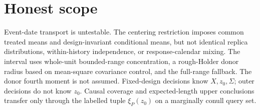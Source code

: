 \documentclass{article}
\begin{document}
\section{Honest scope}

Event-date transport is untestable. The centering restriction imposes common treated means and design-invariant conditional means, but not identical replica distributions, within-history independence, or response-calendar mixing. The interval uses whole-unit bounded-range concentration, a rough-Holder donor radius based on mean-square covariance control, and the full-range fallback. The donor fourth moment is not assumed. Fixed-design decisions know \(X,z_0,\Sigma\); outer decisions do not know \(z_0\). Causal coverage and expected-length upper conclusions transfer only through the labelled tuple \(\xi_P(z_0)\) on a marginally conull query set.
\end{document}
